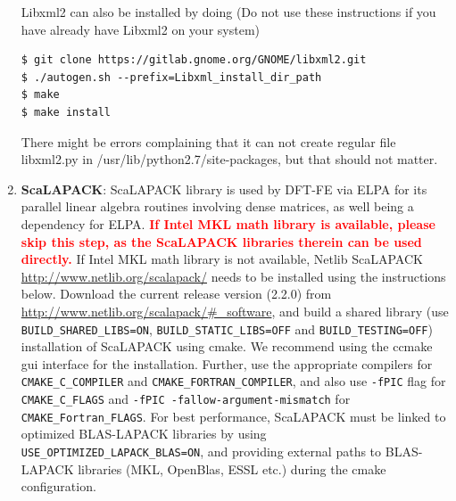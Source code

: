 \begin{enumerate}
Libxml2 can also be installed by doing (Do not use these instructions if you have already have Libxml2 on your system)
\begin{verbatim}
$ git clone https://gitlab.gnome.org/GNOME/libxml2.git
$ ./autogen.sh --prefix=Libxml_install_dir_path
$ make
$ make install 
\end{verbatim}
There might be errors complaining that it can not create regular file libxml2.py in /usr/lib/python2.7/site-packages, but that should not matter.

\item {\bf ScaLAPACK}: ScaLAPACK library is used by DFT-FE via ELPA for its parallel linear algebra routines involving dense matrices, as well being a dependency for ELPA. \textcolor{red}{\bf If Intel MKL math library is available, please skip this step, as the ScaLAPACK libraries therein can be used directly.} If Intel MKL math library is not available, Netlib ScaLAPACK \url{http://www.netlib.org/scalapack/} needs to be installed using the instructions below. Download the current release version (2.2.0) from \url{http://www.netlib.org/scalapack/#\_software}, and build a shared library (use \verb|BUILD_SHARED_LIBS=ON|, \verb|BUILD_STATIC_LIBS=OFF| and \verb|BUILD_TESTING=OFF|) installation of ScaLAPACK using cmake. We recommend using the ccmake gui interface for the installation.  Further, use the appropriate compilers for \verb|CMAKE_C_COMPILER| and \verb|CMAKE_FORTRAN_COMPILER|, and also use \verb|-fPIC| flag for \verb|CMAKE_C_FLAGS| and \verb|-fPIC -fallow-argument-mismatch| for \verb|CMAKE_Fortran_FLAGS|. For best performance, ScaLAPACK must be linked to optimized BLAS-LAPACK libraries by using\\ \verb|USE_OPTIMIZED_LAPACK_BLAS=ON|, and providing external paths to BLAS-LAPACK libraries (MKL, OpenBlas, ESSL etc.) during the cmake configuration. 


\end{enumerate}
